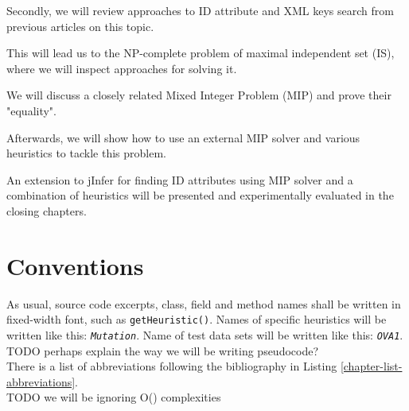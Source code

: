 \documentclass[a4paper,12pt,oneside]{report}
\newcommand{\heu}[1]{\texttt{\textit{#1}}}
\newcommand{\dataset}[1]{\texttt{\textit{#1}}}
\theoremstyle{definition}
\begin{document}
Secondly, we will review approaches to ID attribute and XML keys search from previous articles on this topic. 

This will lead us to the NP-complete problem of maximal independent set (IS), where we will inspect approaches for solving it.

We will discuss a closely related Mixed Integer Problem (MIP) and prove their "equality".

Afterwards, we will show how to use an external MIP solver and various heuristics to tackle this problem.

An extension to jInfer for finding ID attributes using MIP solver and a combination of heuristics will be presented and experimentally evaluated in the closing chapters.

\section{Conventions}

As usual, source code excerpts, class, field and method names shall be written in fixed-width font, such as \texttt{get\-Heu\-ris\-tic()}. Names of specific heuristics will be written like this: \heu{Mutation}. Name of test data sets will be written like this: \dataset{OVA1}.\\

TODO perhaps explain the way we will be writing pseudocode?\\

There is a list of abbreviations following the bibliography in Listing \ref{chapter-list-abbreviations}.\\

TODO we will be ignoring O() complexities















\newpage
\nocite{*}



\listoffigures
{}
\end{document}
